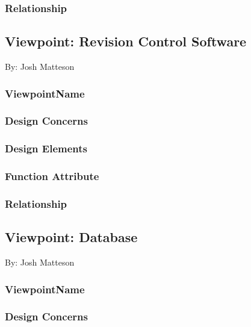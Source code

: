 \documentclass[letterpaper, 10pt, draftclsnofoot, compsoc, onecolumn]{IEEEtran}
\begin{document}
\subsubsection{Relationship}


\subsection{Viewpoint: Revision Control Software}
{\noindent By: Josh Matteson \par}

\subsubsection{ViewpointName}
{\noindent  \par}

\subsubsection{Design Concerns}
{\noindent  \par}

\subsubsection{Design Elements}
{\noindent  \par}

\subsubsection{Function Attribute}
{\noindent  \par}

\subsubsection{Relationship}


\subsection{Viewpoint: Database}
{\noindent By: Josh Matteson \par}

\subsubsection{ViewpointName}
{\noindent  \par}

\subsubsection{Design Concerns}
{\noindent  \par}
\end{document}
